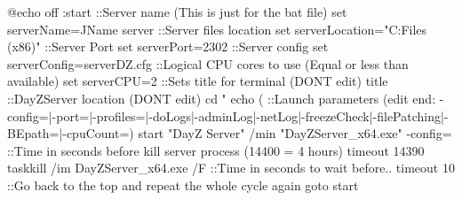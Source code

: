 @echo off
:start
::Server name (This is just for the bat file)
set serverName=JName server
::Server files location
set serverLocation="C:\Program Files (x86)\Steam\steamapps\common\DayZServer"
::Server Port
set serverPort=2302
::Server config
set serverConfig=serverDZ.cfg
::Logical CPU cores to use (Equal or less than available)
set serverCPU=2
::Sets title for terminal (DONT edit)
title %
::DayZServer location (DONT edit)
cd "%
echo (%
::Launch parameters (edit end: -config=|-port=|-profiles=|-doLogs|-adminLog|-netLog|-freezeCheck|-filePatching|-BEpath=|-cpuCount=)
start "DayZ Server" /min "DayZServer_x64.exe" -config=%
::Time in seconds before kill server process (14400 = 4 hours)
timeout 14390
taskkill /im DayZServer_x64.exe /F
::Time in seconds to wait before..
timeout 10
::Go back to the top and repeat the whole cycle again
goto start